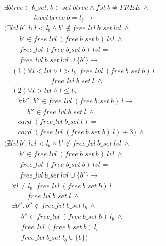 \begin{lemma} 
\label{lemma:free_deallocation}
\end{lemma}
\vspace{-7pt}
\begin{align*}
&\exists btree \in b\_set.\ b \in set\ btree \wedge fst\ b \neq FREE\ \wedge\\
&\ \ \ \ \ \ \ \ \ \ \ \ \ \ \ \ \ \ \ level\ btree\ b = l_b \longrightarrow\\
&(\exists lvl\ b'.\ lvl < l_b \wedge b' \notin free\_lvl\ b\_set\ lvl\ \wedge\\
&\ \ \ \ \ \ \ \ \ \ b' \in free\_lvl\ (free\ b\_set\ b)\ lvl\ \wedge\\
&\ \ \ \ \ \ \ \ \ \ free\_lvl\ (free\ b\_set\ b)\ lvl =\\
&\ \ \ \ \ \ \ \ \ \ free\_lvl\ b\_set\ lvl \cup \lbrace b' \rbrace \longrightarrow\\
&\ \ \ \ \ (1)\forall l < lvl \vee l > l_b.\ free\_lvl\ (free\ b\_set\ b)\ l =\\
&\ \ \ \ \ \ \ \ \ \ \ \ \ \ \ \ \ \ \ \ \ \ \ \ \ \ \ \ \ \ free\_lvl\ b\_set\ l\ \wedge\\
&\ \ \ \ \ (2)\forall l > lvl \wedge l \le l_b.\\
&\ \ \ \ \ \ \ \ \ \forall b''.\ b'' \in free\_lvl\ (free\ b\_set\ b)\ l \longrightarrow\\
&\ \ \ \ \ \ \ \ \ \ \ \ \ \ \ b'' \in free\_lvl\ b\_set\ l\ \wedge\\
&\ \ \ \ \ \ \ \ \ card\ (free\_lvl\ b\_set\ l) =\\
&\ \ \ \ \ \ \ \ \ card\ (free\_lvl\ (free\ b\_set\ b)\ l) + 3)\ \wedge\\
&(\nexists lvl\ b'.\ lvl < l_b \wedge b' \notin free\_lvl\ b\_set\ lvl\ \wedge\\
&\ \ \ \ \ \ \ \ \ \ b' \in free\_lvl\ (free\ b\_set\ b)\ lvl\ \wedge\\
&\ \ \ \ \ \ \ \ \ \ free\_lvl\ (free\ b\_set\ b)\ lvl =\\
&\ \ \ \ \ \ \ \ \ \ free\_lvl\ b\_set\ lvl \cup \lbrace b' \rbrace \longrightarrow\\
&\ \ \ \ \ \forall l \ne l_b.\ free\_lvl\ (free\ b\_set\ b)\ l =\\
&\ \ \ \ \ \ \ \ \ \ \ \ \ \ \ free\_lvl\ b\_set\ l\ \wedge\\
&\ \ \ \ \ \exists b''.\ b'' \notin free\_lvl\ b\_set\ l_b\ \wedge\\
&\ \ \ \ \ \ \ \ \ \ \ b'' \in free\_lvl\ (free\ b\_set\ b)\ l_b\ \wedge\\
&\ \ \ \ \ \ \ \ \ \ \ free\_lvl\ (free\ b\_set\ b)\ l_b =\\
&\ \ \ \ \ \ \ \ \ \ \ free\_lvl\ b\_set\ l_b \cup \lbrace b \rbrace)
\end{align*}
\vspace{-12pt}

